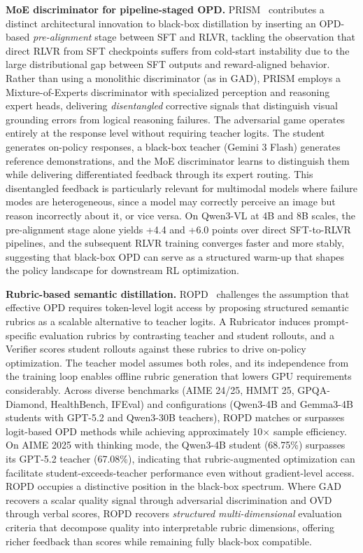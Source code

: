 \documentclass{article} %
\begin{document}
\textbf{MoE discriminator for pipeline-staged OPD.} PRISM~\citep{2604.28123} contributes a distinct architectural innovation to black-box distillation by inserting an OPD-based \emph{pre-alignment} stage between SFT and RLVR, tackling the observation that direct RLVR from SFT checkpoints suffers from cold-start instability due to the large distributional gap between SFT outputs and reward-aligned behavior. Rather than using a monolithic discriminator (as in GAD), PRISM employs a Mixture-of-Experts discriminator with specialized perception and reasoning expert heads, delivering \emph{disentangled} corrective signals that distinguish visual grounding errors from logical reasoning failures. The adversarial game operates entirely at the response level without requiring teacher logits. The student generates on-policy responses, a black-box teacher (Gemini 3 Flash) generates reference demonstrations, and the MoE discriminator learns to distinguish them while delivering differentiated feedback through its expert routing. This disentangled feedback is particularly relevant for multimodal models where failure modes are heterogeneous, since a model may correctly perceive an image but reason incorrectly about it, or vice versa. On Qwen3-VL at 4B and 8B scales, the pre-alignment stage alone yields +4.4 and +6.0 points over direct SFT-to-RLVR pipelines, and the subsequent RLVR training converges faster and more stably, suggesting that black-box OPD can serve as a structured warm-up that shapes the policy landscape for downstream RL optimization.

\textbf{Rubric-based semantic distillation.} ROPD~\citep{2605.07396} challenges the assumption that effective OPD requires token-level logit access by proposing structured semantic rubrics as a scalable alternative to teacher logits. A Rubricator induces prompt-specific evaluation rubrics by contrasting teacher and student rollouts, and a Verifier scores student rollouts against these rubrics to drive on-policy optimization. The teacher model assumes both roles, and its independence from the training loop enables offline rubric generation that lowers GPU requirements considerably. Across diverse benchmarks (AIME 24/25, HMMT 25, GPQA-Diamond, HealthBench, IFEval) and configurations (Qwen3-4B and Gemma3-4B students with GPT-5.2 and Qwen3-30B teachers), ROPD matches or surpasses logit-based OPD methods while achieving approximately 10$\times$ sample efficiency. On AIME 2025 with thinking mode, the Qwen3-4B student (68.75\%) surpasses its GPT-5.2 teacher (67.08\%), indicating that rubric-augmented optimization can facilitate student-exceeds-teacher performance even without gradient-level access. ROPD occupies a distinctive position in the black-box spectrum. Where GAD recovers a scalar quality signal through adversarial discrimination and OVD through verbal scores, ROPD recovers \emph{structured multi-dimensional} evaluation criteria that decompose quality into interpretable rubric dimensions, offering richer feedback than scores while remaining fully black-box compatible.
\end{document}
